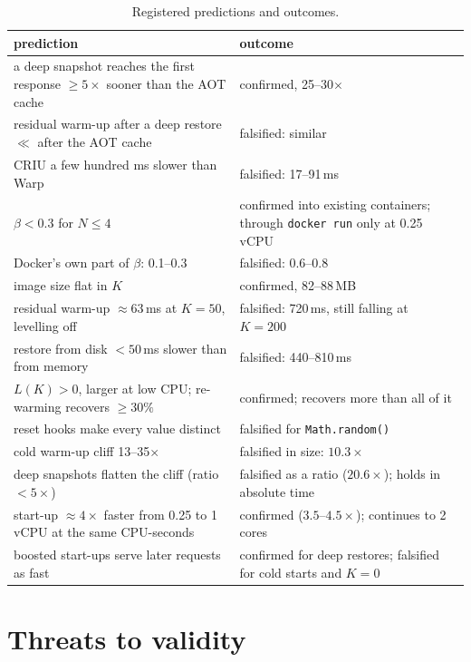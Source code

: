 \begin{table}[htbp]
\centering
\caption{Registered predictions and outcomes.}
\label{tab:m-predictions}
\small
\begin{tabular}{@{}p{}p{}@{}}
\toprule
prediction & outcome \\
\midrule
a deep snapshot reaches the first response $\ge 5\times$ sooner than the AOT cache & confirmed, 25--30$\times$ \\
residual warm-up after a deep restore $\ll$ after the AOT cache & falsified: similar \\
CRIU a few hundred ms slower than Warp & falsified: 17--91\,ms \\
$\beta < 0.3$ for $N \le 4$ & confirmed into existing containers; through \texttt{docker run} only at 0.25\,vCPU \\
Docker's own part of $\beta$: 0.1--0.3 & falsified: 0.6--0.8 \\
image size flat in $K$ & confirmed, 82--88\,MB \\
residual warm-up $\approx 63$\,ms at $K = 50$, levelling off & falsified: 720\,ms, still falling at $K = 200$ \\
restore from disk $< 50$\,ms slower than from memory & falsified: 440--810\,ms \\
$L(K) > 0$, larger at low CPU; re-warming recovers $\ge 30\%$ & confirmed; recovers more than all of it \\
reset hooks make every value distinct & falsified for \texttt{Math.random()} \\
cold warm-up cliff 13--35$\times$ & falsified in size: $10.3\times$ \\
deep snapshots flatten the cliff (ratio $< 5\times$) & falsified as a ratio ($20.6\times$); holds in absolute time \\
start-up $\approx 4\times$ faster from 0.25 to 1\,vCPU at the same CPU-seconds & confirmed ($3.5$--$4.5\times$); continues to 2 cores \\
boosted start-ups serve later requests as fast & confirmed for deep restores; falsified for cold starts and $K = 0$ \\
\bottomrule
\end{tabular}
\end{table}

\section{Threats to validity}
\label{sec:m-threats}

